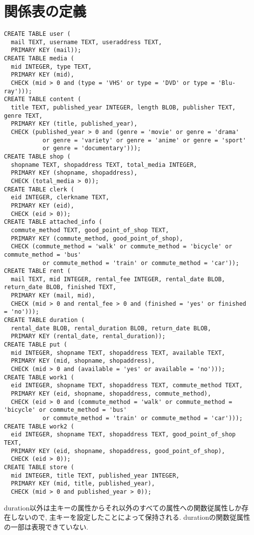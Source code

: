 \documentclass{jarticle}
\begin{document}
\section{関係表の定義}
\begin{verbatim}
CREATE TABLE user ( 
  mail TEXT, username TEXT, useraddress TEXT, 
  PRIMARY KEY (mail));
CREATE TABLE media (
  mid INTEGER, type TEXT, 
  PRIMARY KEY (mid), 
  CHECK (mid > 0 and (type = 'VHS' or type = 'DVD' or type = 'Blu-ray')));
CREATE TABLE content (
  title TEXT, published_year INTEGER, length BLOB, publisher TEXT, genre TEXT,
  PRIMARY KEY (title, published_year), 
  CHECK (published_year > 0 and (genre = 'movie' or genre = 'drama' 
           or genre = 'variety' or genre = 'anime' or genre = 'sport' 
           or genre = 'documentary')));
CREATE TABLE shop (
  shopname TEXT, shopaddress TEXT, total_media INTEGER, 
  PRIMARY KEY (shopname, shopaddress), 
  CHECK (total_media > 0));
CREATE TABLE clerk (
  eid INTEGER, clerkname TEXT, 
  PRIMARY KEY (eid), 
  CHECK (eid > 0));
CREATE TABLE attached_info (
  commute_method TEXT, good_point_of_shop TEXT, 
  PRIMARY KEY (commute_method, good_point_of_shop), 
  CHECK (commute_method = 'walk' or commute_method = 'bicycle' or commute_method = 'bus'
           or commute_method = 'train' or commute_method = 'car'));
CREATE TABLE rent (
  mail TEXT, mid INTEGER, rental_fee INTEGER, rental_date BLOB, return_date BLOB, finished TEXT,
  PRIMARY KEY (mail, mid), 
  CHECK (mid > 0 and rental_fee > 0 and (finished = 'yes' or finished = 'no')));
CREATE TABLE duration (
  rental_date BLOB, rental_duration BLOB, return_date BLOB, 
  PRIMARY KEY (rental_date, rental_duration));
CREATE TABLE put (
  mid INTEGER, shopname TEXT, shopaddress TEXT, available TEXT, 
  PRIMARY KEY (mid, shopname, shopaddress), 
  CHECK (mid > 0 and (available = 'yes' or available = 'no')));
CREATE TABLE work1 (
  eid INTEGER, shopname TEXT, shopaddress TEXT, commute_method TEXT, 
  PRIMARY KEY (eid, shopname, shopaddress, commute_method), 
  CHECK (eid > 0 and (commute_method = 'walk' or commute_method = 'bicycle' or commute_method = 'bus' 
           or commute_method = 'train' or commute_method = 'car')));
CREATE TABLE work2 (
  eid INTEGER, shopname TEXT, shopaddress TEXT, good_point_of_shop TEXT, 
  PRIMARY KEY (eid, shopname, shopaddress, good_point_of_shop), 
  CHECK (eid > 0));
CREATE TABLE store (
  mid INTEGER, title TEXT, published_year INTEGER, 
  PRIMARY KEY (mid, title, published_year), 
  CHECK (mid > 0 and published_year > 0));
\end{verbatim}
duration以外は主キーの属性からそれ以外のすべての属性への関数従属性しか存在しないので, 主キーを設定したことによって保持される. durationの関数従属性の一部は表現できていない.
\end{document}
